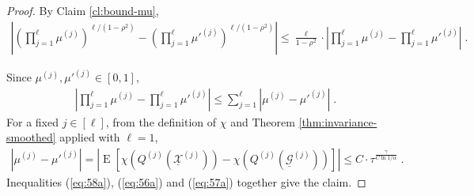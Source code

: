 \documentclass{daj}
\newcommand{\1}{\mathbbm{1}}
\theoremstyle{plain}
\theoremstyle{definition}
\DeclareMathOperator*{\EE}{E}
\begin{document}
\begin{proof}
By Claim \ref{cl:bound-mu},
\begin{align}
\label{eq:58a}
\left| \left( \prod_{j=1}^\ell \mu^{(j)} \right)^{\ell / (1-\rho^2)}  - 
\left( \prod_{j=1}^\ell \mu'^{(j)} \right)^{\ell / (1-\rho^2)}  \right|
\le \frac{\ell}{1-\rho^2} \cdot
\left| \prod_{j=1}^\ell \mu^{(j)}  - 
 \prod_{j=1}^\ell \mu'^{(j)}  \right| \; .
\end{align}

Since $\mu^{(j)}, \mu'^{(j)} \in [0, 1]$,
\begin{align}
\label{eq:56a}
\left| \prod_{j=1}^\ell \mu^{(j)} - \prod_{j=1}^\ell \mu'^{(j)} \right|
\le \sum_{j=1}^\ell \left| \mu^{(j)} - \mu'^{(j)} \right| \; .
\end{align}
For a fixed $j \in [\ell]$, from the definition of $\chi$ and Theorem
\ref{thm:invariance-smoothed} applied with $\ell=1$,
\begin{align}
\label{eq:57a}
  \left| \mu^{(j)} - \mu'^{(j)} \right|
  = \left| \EE \left[ \chi\left(Q^{(j)}(\underline{\mathcal{X}}^{(j)})\right)
  - \chi\left(Q^{(j)}(\underline{\mathcal{G}}^{(j)})\right) \right] \right|
  \le C \cdot \tau^{\frac{\gamma}{C \ln 1/\alpha}} \; .
\end{align}
Inequalities (\ref{eq:58a}), (\ref{eq:56a}) and (\ref{eq:57a}) together give the claim.
\end{proof}
\end{document}
